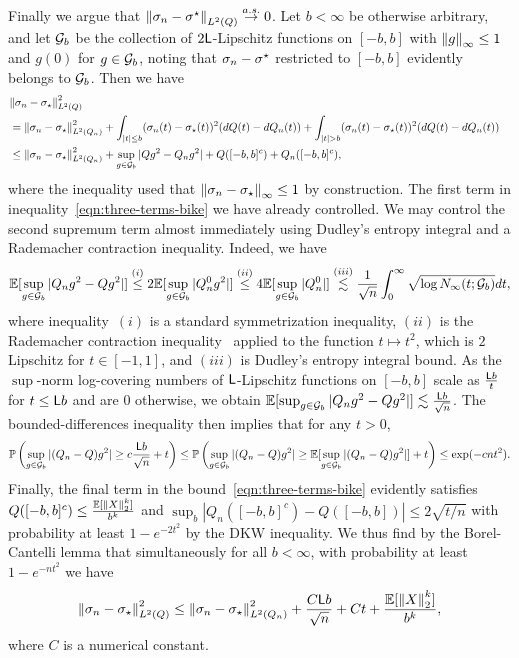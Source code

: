 Finally we argue that $\left\|{\sigma_n - \sigma^\star}\right\|_{L^2(Q)} \stackrel{a.s.}{\rightarrow} 0$.
Let $b < \infty$ be otherwise arbitrary, and let
$\mathcal{G}_b$ be the collection of $2\mathsf{L}$-Lipschitz functions on
$[-b, b]$ with $\left\|{g}\right\|_\infty \le 1$ and $g(0)$ for $g \in \mathcal{G}_b$, noting
that $\sigma_n - \sigma^\star$ restricted to $[-b, b]$ evidently
belongs to $\mathcal{G}_b$. Then we have
\begin{align}
  \lefteqn{\LtwoQ{\sigma_n - \sigma\subopt}^2} \nonumber \\
  & = \LtwoQn{\sigma_n - \sigma\subopt}^2
  + \int_{|t| \le b} (\sigma_n(t) - \sigma\subopt(t))^2
  (dQ(t) - dQ_n(t))
  + \int_{|t| > b} (\sigma_n(t) - \sigma\subopt(t))^2 
  (dQ(t) - dQ_n(t)) \nonumber \\
  & \le \LtwoQn{\sigma_n - \sigma\subopt}^2
  + \sup_{g \in \mc{G}_b} |Q g^2 - Q_n g^2|
  + Q([-b, b]^c) + Q_n([-b, b]^c),
  \label{eqn:three-terms-bike}
\end{align}
where the inequality used that $\left\|{\sigma_n - \sigma_\star}\right\|_\infty \le 1$
by construction.
The first term in inequality~\eqref{eqn:three-terms-bike} we have
already controlled. We may control the second supremum term
almost immediately using Dudley's entropy integral
and a Rademacher contraction inequality.
Indeed, we have
\begin{equation*}
  \mathbb{E}[\sup_{g \in \mathcal{G}_b} |Q_n g^2 - Q g^2|]
  \stackrel{(i)}{\le} 2 \mathbb{E}[\sup_{g \in \mathcal{G}_b} |Q_n^0 g^2|]
  \stackrel{(ii)}{\le} 4 \mathbb{E}[\sup_{g \in \mathcal{G}_b} |Q_n^0|]
  \stackrel{(iii)}{\lesssim} \frac{1}{\sqrt{n}} \int_0^\infty
  \sqrt{\log N_\infty(t; \mathcal{G}_b)} dt,
\end{equation*}
where inequality~$(i)$ is a standard symmetrization inequality, $(ii)$ is
the Rademacher contraction inequality~\cite[Ch.~4]{LedouxTa91} applied to
the function $t \mapsto t^2$, which is $2$ Lipschitz for $t \in [-1, 1]$,
and $(iii)$ is Dudley's entropy integral bound. As the $\sup$-norm
log-covering numbers of $\mathsf{L}$-Lipschitz functions on $[-b, b]$ scale
as $\frac{\mathsf{L} b}{t}$ for $t \le \mathsf{L} b$ and are 0 otherwise, we
obtain $\mathbb{E}[\sup_{g \in \mathcal{G}_b} |Q_n g^2 - Q g^2|] \lesssim
\frac{\mathsf{L} b}{\sqrt{n}}$.  The bounded-differences inequality then implies that
for any $t > 0$,
\begin{equation*}
  \mathbb{P}\left(\sup_{g \in \mathcal{G}_b} |(Q_n - Q)g^2|
  \ge c \frac{\mathsf{L} b}{\sqrt{n}} + t \right) \le
  \mathbb{P}\left(\sup_{g \in \mathcal{G}_b} |(Q_n - Q) g^2|
  \ge \mathbb{E}[\sup_{g \in \mathcal{G}_b} |(Q_n - Q) g^2|] + t \right)
  \le \exp(-c n t^2).
\end{equation*}
Finally, the final term in the bound~\eqref{eqn:three-terms-bike}
evidently satisfies $Q([-b, b]^c) \le \frac{\mathbb{E}[\left\|{X}\right\|_2^k]}{b^k}$
and $\sup_b |Q_n([-b,b]^c) - Q([-b, b])| \le 2 \sqrt{t / n}$
with probability at least $1 - e^{-2t^2}$ by the DKW inequality.
We thus find by the Borel-Cantelli lemma that simultaneously
for all $b < \infty$, with probability at least
$1 - e^{-nt^2}$ we have
\begin{equation*}
  \left\|{\sigma_n - \sigma_\star}\right\|_{L^2(Q)}^2 \le
  \left\|{\sigma_n - \sigma_\star}\right\|_{L^2(Q_n)}^2
  + \frac{C \mathsf{L} b}{\sqrt{n}} + C t + \frac{\mathbb{E}[\left\|{X}\right\|_2^k]}{b^k},
\end{equation*}
where $C$ is a numerical constant.

